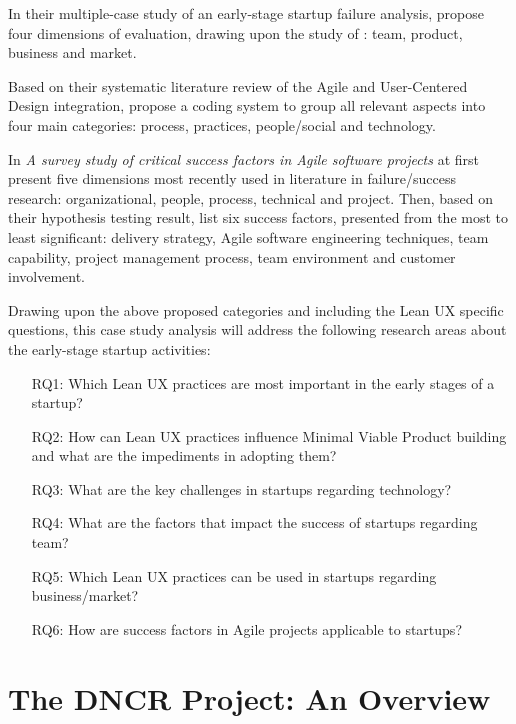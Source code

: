 \documentclass{article}
\begin{document}
In their multiple-case study of an early-stage startup failure analysis, \cite{giardino2014early} propose four dimensions of evaluation, drawing upon the study of \cite{macmillan1987criteria}: team, product, business and market.

Based on their systematic literature review of the Agile and User-Centered Design integration,  \cite{brhel2015exploring} propose a coding system to group all relevant aspects into four main categories: process, practices, people/social and technology.

In \textit{A survey study of critical success factors in Agile software projects} \cite{cao2008agile} at first present five dimensions most recently used in literature in failure/success research: organizational, people, process, technical and project. Then, based on their hypothesis testing result, \citeauthor{cao2008agile} list six success factors, presented from the most to least significant: delivery strategy, Agile software engineering techniques, team capability, project management process, team environment and customer involvement.

Drawing upon the above proposed categories and including the Lean UX specific questions, this case study analysis will address the following research areas about the early-stage startup activities:

\begin{itemize}
\item[RQ1:] Which Lean UX practices are most important in the early stages of a startup?
\item[RQ2:] How can Lean UX practices influence Minimal Viable Product building and what are the impediments in adopting them?
\item[RQ3:] What are the key challenges in startups regarding technology?
\item[RQ4:] What are the factors that impact the success of startups regarding team?
\item[RQ5:] Which Lean UX practices can be used in startups regarding business/market?
\item[RQ6:] How are success factors in Agile projects \citep{cao2008agile} applicable to startups?

\end{itemize}

\section{The DNCR Project: An Overview}
\label{sec:dncr-project}
\end{document}
